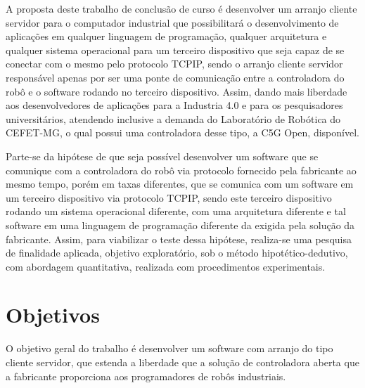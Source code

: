         A proposta deste trabalho de conclusão de curso é desenvolver um arranjo cliente servidor para o computador industrial que possibilitará o desenvolvimento de aplicações em qualquer linguagem de programação, qualquer arquitetura e qualquer sistema operacional para um terceiro dispositivo que seja capaz de se conectar com o mesmo pelo protocolo \ac{TCPIP}, sendo o arranjo cliente servidor responsável apenas por ser uma ponte de comunicação entre a controladora do robô e o software rodando no terceiro dispositivo. Assim, dando mais liberdade aos desenvolvedores de aplicações para a Industria 4.0 e para os pesquisadores universitários, atendendo inclusive a demanda do Laboratório de Robótica do CEFET-MG, o qual possui uma controladora desse tipo, a C5G Open, disponível.
        

	    Parte-se da hipótese de que seja possível desenvolver um software que se comunique com a controladora do robô via protocolo fornecido pela fabricante ao mesmo tempo, porém em taxas diferentes, que se comunica com um software em um terceiro dispositivo via protocolo \ac{TCPIP}, sendo este terceiro dispositivo rodando um sistema operacional diferente, com uma arquitetura diferente e tal software em uma linguagem de programação diferente da exigida pela solução da fabricante. Assim, para viabilizar o teste dessa hipótese, realiza-se uma pesquisa de finalidade aplicada, objetivo exploratório, sob o método hipotético-dedutivo, com abordagem quantitativa, realizada com procedimentos experimentais. %
        
    \section{Objetivos} %
        O objetivo geral do trabalho é desenvolver um software com arranjo do tipo cliente servidor, que estenda a liberdade que a solução de controladora aberta que a fabricante proporciona aos programadores de robôs industriais.
		

